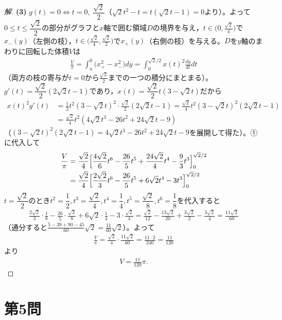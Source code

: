 \documentclass[../main.tex]{subfiles}
\begin{document}
\begin{proof}[解]
  \textbf{(3)} $g(t)=0\iff t=0,\ \dfrac{\sqrt2}2$（$\sqrt2t^2-t=t(\sqrt2t-1)=0$より）。よって$0\le t\le\dfrac{\sqrt2}2$の部分がグラフと$x$軸で囲む領域$D$の境界を与え，$t\in\bigl(0,\frac{\sqrt2}4\bigr)$で$x_-(y)$（左側の枝），$t\in\bigl(\frac{\sqrt2}4,\frac{\sqrt2}2\bigr)$で$x_+(y)$（右側の枝）を与える。$D$を$y$軸のまわりに回転した体積$V$は
  \begin{align*}
    \frac V\pi=\int_a^0\bigl(x_+^2-x_-^2\bigr)dy=\int_0^{\sqrt2/2}x(t)^2\frac{dy}{dt}dt\tag{①}
  \end{align*}
  （両方の枝の寄与が$t=0$から$\frac{\sqrt2}2$までの一つの積分にまとまる）。$g'(t)=\dfrac{\sqrt2}2(2\sqrt2t-1)$であり，$x(t)=\dfrac{\sqrt2}2t(3-\sqrt2t)$だから
  \begin{align*}
    x(t)^2g'(t)&=\frac12t^2(3-\sqrt2t)^2\cdot\frac{\sqrt2}2(2\sqrt2t-1)=\frac{\sqrt2}4t^2(3-\sqrt2t)^2(2\sqrt2t-1)\\
    &=\frac{\sqrt2}4t^2(4\sqrt2t^3-26t^2+24\sqrt2t-9)
  \end{align*}
  （$(3-\sqrt2t)^2(2\sqrt2t-1)=4\sqrt2t^3-26t^2+24\sqrt2t-9$を展開して得た）。①に代入して
  \begin{align*}
    \frac V\pi&=\frac{\sqrt2}4\Bigl[\frac{4\sqrt2}6t^6-\frac{26}5t^5+\frac{24\sqrt2}4t^4-\frac93t^3\Bigr]_0^{\sqrt2/2}\\
    &=\frac{\sqrt2}4\Bigl[\frac{2\sqrt2}3t^6-\frac{26}5t^5+6\sqrt2t^4-3t^3\Bigr]_0^{\sqrt2/2}
  \end{align*}
  $t=\dfrac{\sqrt2}2$のとき$t^2=\dfrac12,t^3=\dfrac{\sqrt2}4,t^4=\dfrac14,t^5=\dfrac{\sqrt2}8,t^6=\dfrac18$を代入すると
  \begin{align*}
    \frac{2\sqrt2}3\cdot\frac18-\frac{26}5\cdot\frac{\sqrt2}8+6\sqrt2\cdot\frac14-3\cdot\frac{\sqrt2}4=\frac{\sqrt2}{12}-\frac{13\sqrt2}{20}+\frac{3\sqrt2}2-\frac{3\sqrt2}4=\frac{11\sqrt2}{60}
  \end{align*}
  （通分すると$\frac{5-39+90-45}{60}\sqrt2=\frac{11}{60}\sqrt2$）。よって
  \begin{align*}
    \frac V\pi=\frac{\sqrt2}4\cdot\frac{11\sqrt2}{60}=\frac{11\cdot2}{240}=\frac{11}{120}
  \end{align*}
  より
  \begin{align*}
    V=\frac{11}{120}\pi.
  \end{align*}
\end{proof}

\newpage

\section*{第5問}
\end{document}
